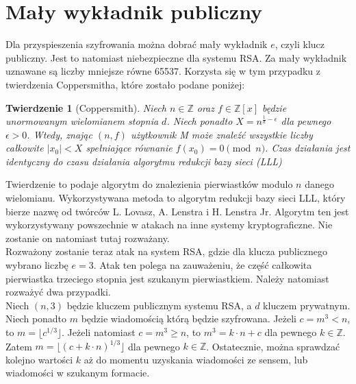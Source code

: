 \documentclass[12pt,twoside,a4]{mwbk}
\newtheorem{twierdzenie}{Twierdzenie}[chapter]
\theoremstyle{definition}
\begin{document}
\section{Mały wykładnik publiczny}
Dla przyspieszenia szyfrowania można dobrać mały wykładnik $e$, czyli klucz publiczny. Jest to natomiast niebezpieczne dla systemu RSA. Za mały wykładnik uznawane są liczby mniejsze równe 65537. Korzysta się w tym przypadku z twierdzenia Coppersmitha, które zostało podane poniżej:

\begin{twierdzenie}[Coppersmith]{\cite{survey}}
Niech $n \in \mathbb{Z}$ oraz $f \in \mathbb{Z}[x]$ będzie unormowanym wielomianem stopnia $d$. Niech ponadto $X = n^{\frac{1}{d}-\epsilon}$ dla pewnego $\epsilon > 0$. Wtedy, znając $(n,f)$ użytkownik M może znaleźć wszystkie liczby całkowite $|x_0| < X$ spełniające równanie $f(x_0) = 0 \pmod{n}$. Czas działania jest identyczny do czasu działania algorytmu redukcji bazy sieci (LLL)%
\end{twierdzenie}

Twierdzenie to podaje algorytm do znalezienia pierwiastków modulo $n$ danego wielomianu. Wykorzystywana metoda to algorytm redukcji bazy sieci LLL, który bierze nazwę od twórców L. Lovasz, A. Lenstra i H. Lenstra Jr. Algorytm ten jest wykorzystywany powszechnie w atakach na inne systemy kryptograficzne. Nie zostanie on natomiast tutaj rozważany. \\

Rozważony zostanie teraz atak na system RSA, gdzie dla klucza publicznego wybrano liczbę $e = 3$. Atak ten polega na zauważeniu, że część całkowita pierwiastka trzeciego stopnia jest szukanym pierwiastkiem. Należy natomiast rozważyć dwa przypadki. \\

Niech $(n,3)$ będzie kluczem publicznym systemu RSA, a $d$ kluczem prywatnym. Niech ponadto $m$ będzie wiadomością którą będzie szyfrowana. Jeżeli $c = m^3 < n$, to $m = \lfloor c^{1/3} \rfloor$. Jeżeli natomiast $c = m^3 \geq n$, to $m^3 = k \cdot n + c$ dla pewnego $k \in \mathbb{Z}$. Zatem $m = \lfloor ( c + k \cdot n )^{1/3} \rfloor$ dla pewnego $k \in \mathbb{Z}$. Ostatecznie, można sprawdzać kolejno wartości $k$ aż do momentu uzyskania wiadomości ze sensem, lub wiadomości w szukanym formacie.
\end{document}
